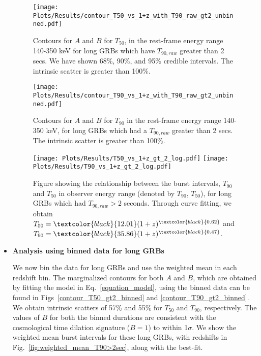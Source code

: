 \documentclass[prd,nofootinbib,preprintnumbers,floatfix]{revtex4}  %
\newcommand{\rthis}[1]{\textcolor{black}{#1}}
\begin{document}
\begin{itemize}
\begin{figure}
    \centering
    \texttt{[image: Plots/Results/contour\_T50\_vs\_1+z\_with\_T90\_raw\_gt2\_unbinned.pdf]}
    
 \caption{Contours for $A$ and $B$ for $T_{50}$, in the rest-frame energy range 140-350 keV  for long GRBs which have  $T_{90,raw}$ greater than 2 secs. We have shown 68\%, 90\%,  and 95\% credible intervals. The intrinsic scatter is greater than 100\%.}
 \label{contour_T50_with_T90_raw_gt2}
\end{figure}

\begin{figure}
    \centering
    \texttt{[image: Plots/Results/contour\_T90\_vs\_1+z\_with\_T90\_raw\_gt2\_unbinned.pdf]}
    
 \caption{Contours for $A$ and $B$ for $T_{90}$ in the rest-frame energy range 140-350 keV, for long GRBs which had a $T_{90,raw}$ greater than 2 secs. The intrinsic scatter is greater than 100\%. }
 
 \label{contour_T90_with_T90_raw_gt2}
\end{figure}


\begin{figure*}
    \centering



 \texttt{[image: Plots/Results/T50\_vs\_1+z\_gt\_2\_log.pdf]}
    \texttt{[image: Plots/Results/T90\_vs\_1+z\_gt\_2\_log.pdf]}
    \caption{Figure showing the relationship between the burst intervals, $T_{90}$ and $T_{50}$ in observer energy range (denoted by $T_{90}$, $T_{50}$), for long GRBs which had $T_{90,raw}>2 $ seconds.  Through curve fitting, we obtain $T_{50}=\rthis{12.01}(1+z)^{\rthis{0.62}}$ and $T_{90}=\rthis{35.86}(1+z)^{\rthis{0.47}}$. }
    \label{fig:burst_interval_T90>2sec}
\end{figure*}


\item {\bf Analysis using binned data for long GRBs}

We now bin the data for long GRBs and use the weighted mean in each redshift bin.
The marginalized contours for both $A$ and $B$, which are obtained by fitting the model in Eq.~\ref{equation_model}, using the binned data  can be found in  Figs~\ref{contour_T50_gt2_binned} and \ref{contour_T90_gt2_binned}. We obtain intrinsic scatters of 57\% and 55\% for $T_{50}$ and $T_{90}$, respectively. The values of $B$ for both the binned durations
are consistent with the cosmological time dilation signature ($B=1$) to within 1$\sigma$.
We  show the weighted mean burst intervals for these long GRBs, with redshifts in Fig.~\ref{fig:weighted_mean_T90>2sec}, along with the best-fit.


\end{itemize}
\end{document}
